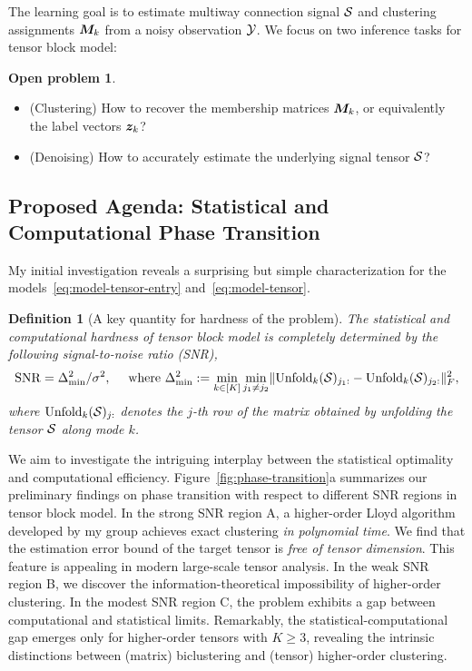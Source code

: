 \documentclass[11pt]{article}
\DeclareRobustCommand{\mybox}[2][gray!20]{%
\begin{tcolorbox}[   %
        breakable,
        left=0pt,
        right=0pt,
        top=0pt,
        bottom=0pt,
        colback=#1,
        colframe=#1,
        width=\dimexpr\textwidth\relax, 
        enlarge left by=0mm,
        boxsep=5pt,
        arc=0pt,outer arc=0pt,
        ]
        #2
\end{tcolorbox}}
\DeclareRobustCommand{\mybox}[2][gray!20]{%
\begin{tcolorbox}[   %
        breakable,
        left=0pt,
        right=0pt,
        top=0pt,
        bottom=0pt,
        colback=#1,
        colframe=#1,
        width=\dimexpr\textwidth\relax, 
        enlarge left by=0mm,
        boxsep=5pt,
        arc=0pt,outer arc=0pt,
        ]
        #2
\end{tcolorbox}
}
\theoremstyle{exampstyle}
\newtheorem{defn}{Definition}[section]
\theoremstyle{definition}
\newtheorem{open}[]{Open problem}
\newcommand{\SNR}{{\rm SNR}}
\begin{document}
The learning goal is to estimate multiway connection signal $\mathcal{S}$ and clustering assignments $\bm M_k$ from a noisy observation $\mathcal{Y}$. We focus on two inference tasks for tensor block model:
\mybox[gray!20]{
\begin{open}
\begin{itemize}[leftmargin=*]\hfill
\item (Clustering) How to recover the membership matrices $\bm M_k$, or equivalently the label vectors $\bm{z}_k$?
\item (Denoising) How to accurately estimate the underlying signal tensor $\mathcal{S}$?
\end{itemize}
\end{open}
}


\vspace{-.2cm}
\subsection{Proposed Agenda: Statistical and Computational Phase Transition}
\vspace{-.2cm}
My initial investigation reveals a surprising but simple characterization for the models~\eqref{eq:model-tensor-entry} and~\eqref{eq:model-tensor}. 
\begin{defn}[A key quantity for hardness of the problem]
The statistical and computational hardness of tensor block model is completely determined by the following signal-to-noise ratio (SNR),
\[
\SNR= \Delta_{\min}^2/\sigma^2,\quad \text{~where } \Delta_{\min}^2 := \min_{k\in [K]}\min_{j_1 \neq j_2} \FnormSize{}{\text{Unfold}_k(\tS)_{j_1:} - \text{Unfold}_k(\tS)_{j_2:}}^2,
\]
where $\text{Unfold}_k(\mathcal{S})_{j:}$ denotes the $j$-th row of the matrix obtained by unfolding the tensor $\mathcal{S}$ along mode $k$. 
\end{defn}
We aim to investigate the intriguing interplay between the statistical optimality and computational efficiency. Figure~\ref{fig:phase-transition}a summarizes our preliminary findings on phase transition with respect to different SNR regions in tensor block model. In the strong SNR region A, a higher-order Lloyd algorithm developed by my group achieves exact clustering {\it in polynomial time}. We find that the estimation error bound of the target tensor is \emph{free of tensor dimension}. This feature is appealing in modern large-scale tensor analysis. In the weak SNR region B, we discover the information-theoretical impossibility of higher-order clustering. In the modest SNR region C, the problem exhibits a gap between computational and statistical limits. Remarkably, the statistical-computational gap emerges only for higher-order tensors with $K \geq 3$, revealing the intrinsic distinctions between (matrix) biclustering and (tensor) higher-order clustering.  
\end{document}
